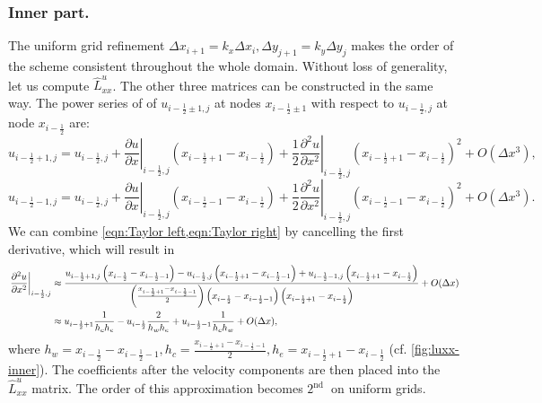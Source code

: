 \documentclass{article}
\numberwithin{equation}{section}
\begin{document}
\subsubsection{Inner part.}\label{sec:laplacian-inner}
The uniform grid refinement $\Delta x_{i+1}=k_x\Delta x_i,\Delta y_{j+1}=k_y\Delta y_j$ makes the order of the scheme consistent throughout the whole domain. Without loss of generality, let us compute $\hat{L}^u_{xx}$. The other three matrices can be constructed in the same way. The power series of of $u_{i-\frac{1}{2}\pm 1,j}$ at nodes $x_{i - \frac{1}{2}\pm 1}$ with respect to $u_{i - \frac{1}{2},j}$ at node $x_{i-\frac{1}{2}}$ are:
\begin{equation}\label{eqn:Taylor right} 
	u_{i-\frac{1}{2}+1,j}=u_{i-\frac{1}{2},j}+\left.\frac{\partial u}{\partial x}\right|_{i-\frac{1}{2},j}\left(x_{i-\frac{1}{2}+1}-x_{i-\frac{1}{2}}\right)+\frac{1}{2}\left.\frac{\partial^2 u}{\partial x^2}\right|_{i-\frac{1}{2},j}\left(x_{i-\frac{1}{2}+1}-x_{i-\frac{1}{2}}\right)^2+O\left(\Delta x^3\right),
\end{equation}
\begin{equation}\label{eqn:Taylor left} 
	u_{i-\frac{1}{2}-1,j}=u_{i-\frac{1}{2},j}+\left.\frac{\partial u}{\partial x}\right|_{i-\frac{1}{2},j}\left(x_{i-\frac{1}{2}-1}-x_{i-\frac{1}{2}}\right)+\frac{1}{2}\left.\frac{\partial^2 u}{\partial x^2}\right|_{i-\frac{1}{2},j}\left(x_{i-\frac{1}{2}-1}-x_{i-\frac{1}{2}}\right)^2+O\left(\Delta x^3\right).
\end{equation}
We can combine \cref{eqn:Taylor left,eqn:Taylor right} by cancelling the first derivative, which will result in
\begin{align}\label{eqn:laplacian-discretization-non-uniform-dx}
\left.\frac{\partial^2 u}{\partial x^2}\right|_{i-\frac{1}{2},j} & \approx \frac{u_{i-\frac{1}{2}+1,j}\left(x_{i-\frac{1}{2}}-x_{i-\frac{1}{2}-1}\right)-u_{i-\frac{1}{2},j}\left(x_{i-\frac{1}{2}+1}-x_{i-\frac{1}{2}-1}\right)+u_{i-\frac{1}{2}-1,j}\left(x_{i-\frac{1}{2}+1}-x_{i-\frac{1}{2}}\right)}{\left(\frac{x_{i-\frac{1}{2}+1}-x_{i-\frac{1}{2}-1}}{2}\right)\left(x_{i-\frac{1}{2}}-x_{i-\frac{1}{2}-1}\right)\left(x_{i-\frac{1}{2}+1}-x_{i-\frac{1}{2}}\right)}+O(\Delta x)\notag\\
& \approx u_{i-\frac{1}{2}+1}\frac{1}{h_c h_e} - u_{i-\frac{1}{2}} \frac{2}{h_w h_e}+ u_{i-\frac{1}{2}-1}\frac{1}{h_c h_w} + O(\Delta x),
\end{align}
where $h_w=x_{i-\frac{1}{2}}-x_{i-\frac{1}{2}-1},h_c = \frac{x_{i-\frac{1}{2}+1}-x_{i-\frac{1}{2}-1}}{2}, h_e = x_{i-\frac{1}{2}+1}-x_{i-\frac{1}{2}}$ (cf. \cref{fig:luxx-inner}). The coefficients after the velocity components are then placed into the $\hat{L}^u_{xx}$ matrix. The order of this approximation becomes $2^{\text {nd }}$ on uniform grids. 
\end{document}

